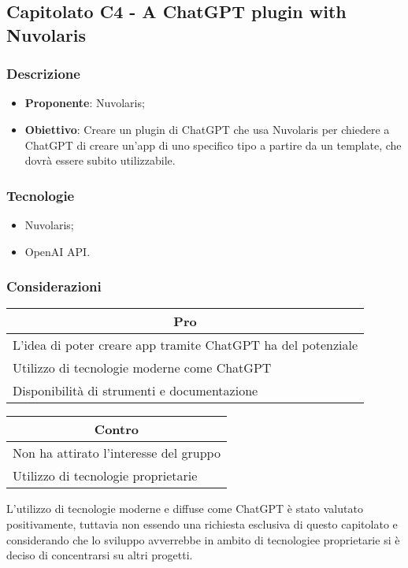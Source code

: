 \subsection{Capitolato C4 - A ChatGPT plugin with Nuvolaris}


\subsubsection{Descrizione}
\begin{itemize}
    \item \textbf{Proponente}: Nuvolaris;
    \item \textbf{Obiettivo}: Creare un plugin di ChatGPT che usa Nuvolaris per chiedere a ChatGPT di creare un'app di uno specifico tipo a partire da un template, che dovrà essere subito utilizzabile.
\end{itemize}


\subsubsection{Tecnologie}
\begin{itemize}
    \item Nuvolaris;
    \item OpenAI API.
\end{itemize}


\subsubsection{Considerazioni}
\begin{minipage}[t]{0.45\linewidth}
    \vspace{0pt}
    {\renewcommand{\arraystretch}{1.5}
    \begin{tabular}{p{1\linewidth}}
        \multicolumn{1}{c}{\textbf{Pro}} \\
        \midrule
        L'idea di poter creare app tramite ChatGPT ha del potenziale \\
        Utilizzo di tecnologie moderne come ChatGPT \\
        Disponibilità di strumenti e documentazione \\
        \hline
    \end{tabular}
    }
\end{minipage}
\hspace{0.05\linewidth}
\begin{minipage}[t]{0.45\linewidth}
    \vspace{0pt}
    {\renewcommand{\arraystretch}{1.5}
    \begin{tabular}{p{1\linewidth}}
        \multicolumn{1}{c}{\textbf{Contro}} \\
        \midrule
        Non ha attirato l'interesse del gruppo \\
        Utilizzo di tecnologie proprietarie \\
        \hline
    \end{tabular}
    }
\end{minipage}
\vspace{1em}

L'utilizzo di tecnologie moderne e diffuse come ChatGPT è stato valutato positivamente, tuttavia non essendo una richiesta esclusiva di questo capitolato e considerando che lo sviluppo avverrebbe in ambito di tecnologiee proprietarie si è deciso di concentrarsi su altri progetti.